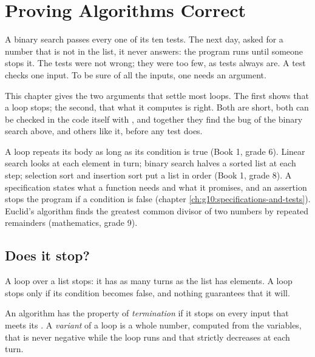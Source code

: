 \chapter{Proving Algorithms Correct}\label{ch:g11:proving-algorithms-correct}

A binary search passes every one of its ten tests. The next day, asked for a number that is not in the list, it never
answers: the program runs until someone stops it. The tests were not wrong; they were too few, as tests always are. A
test checks one input. To be sure of all the inputs, one needs an argument.

This chapter gives the two arguments that settle most loops. The first shows that a loop stops; the second, that what
it computes is right. Both are short, both can be checked in the code itself with , and together they find
the bug of the binary search above, and others like it, before any test does.

\begin{recall}
A  loop repeats its body as long as its condition is true (Book 1, grade 6). Linear search looks at each
element in turn; binary search halves a sorted list at each step; selection sort and insertion sort put a list in
order (Book 1, grade 8). A specification states what a function needs and what it promises, and an assertion
stops the program if a condition is false (chapter \ref{ch:g10:specifications-and-tests}). Euclid's algorithm finds
the greatest common divisor of two numbers by repeated remainders (mathematics, grade 9).
\end{recall}

\section{Does it stop?}\label{sec:g11:proving-algorithms-correct:termination}

A  loop over a list stops: it has as many turns as the list has elements. A  loop stops only if
its condition becomes false, and nothing guarantees that it will.

\begin{definition}\label{def:g11:proving-algorithms-correct:variant}
An algorithm has the property of \emph{termination} if it stops on every input that meets its
. A \emph{variant} of a loop is a whole number, computed from the
variables, that is never negative while the loop runs and that strictly decreases at each turn.
\end{definition}

